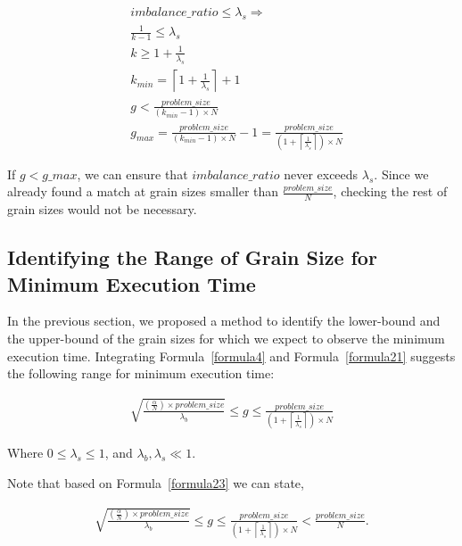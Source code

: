 \begin{equation}\label{formula21}
\begin{aligned}
&imbalance\_{ratio}\leq{{\lambda_s}}\Rightarrow\\
&\frac{1}{k-1}\leq\lambda_s\\
&k\geq{1+\frac{1}{\lambda_s}}\\
&k_{min}=\left\lceil{1+\frac{1}{\lambda_s}}\right\rceil+1\\
&{g}<\frac{problem\_{size}}{(k_{min}-1)\times{N}}\\
&g_{max}=\frac{problem\_{size}}{(k_{min}-1)\times{N}}-1=\frac{problem\_{size}}{(1+\left\lceil{\frac{1}{\lambda_s}}\right\rceil)\times{N}}
\end{aligned}
\end{equation}

If $g<g\_{max}$, we can ensure that $imbalance\_{ratio}$ never exceeds $\lambda_s$. Since we already found a match at grain sizes smaller than $\frac{problem\_{size}}{N}$, checking the rest of grain sizes would not be necessary.



\vspace{\baselineskip}
\subsection{Identifying the Range of Grain Size for Minimum Execution Time}
In the previous section, we proposed a method to identify the lower-bound and the upper-bound of the grain sizes for which we expect to observe the minimum execution time. 
Integrating Formula~\ref{formula4} and Formula~\ref{formula21} suggests the following range for minimum execution time:


\begin{equation}\label{formula23}
\begin{aligned}
{\sqrt{\frac{(\frac{\alpha}{N})\times{problem\_{size}}}{{\lambda_b}}}}\leq{g}\leq\frac{problem\_{size}}{(1+\left\lceil{\frac{1}{\lambda_s}}\right\rceil)\times{N}}
\end{aligned}
\end{equation}
 
Where $0\leq\lambda_s\leq1$, and $\lambda_b,\lambda_s\ll1$.

Note that based on Formula~\ref{formula23} we can state,

\begin{equation}\label{formula43}
\begin{aligned}
{\sqrt{\frac{(\frac{\alpha}{N})\times{problem\_{size}}}{{\lambda_b}}}}\leq{g}\leq\frac{problem\_{size}}{(1+\left\lceil{\frac{1}{\lambda_s}}\right\rceil)\times{N}}<\frac{problem\_{size}}{N}.
\end{aligned}
\end{equation}

